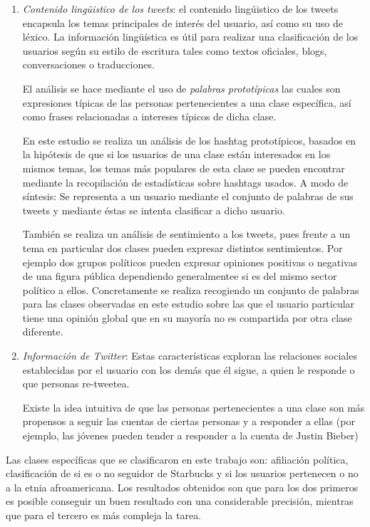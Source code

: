 \begin{enumerate}
        \item \emph{Contenido lingüistico de los tweets}: el contenido lingúistico de los tweets encapsula los temas
        principales de interés del usuario, así como su uso de léxico. La información lingüística es útil para realizar
        una clasificación de los usuarios según su estilo de escritura tales como textos oficiales, blogs,
        conversaciones o traducciones.
       
        El análisis se hace mediante el uso de \emph{palabras prototípicas} las cuales son expresiones típicas de las
        personas pertenecientes a una clase específica, así como frases relacionadas a intereses típicos de dicha clase.
       
        En este estudio se realiza un análisis de los hashtag prototípicos, basados en la hipótesis de que si los usuarios
        de una clase están interesados en los mismos temas, los temas más populares de esta clase se pueden encontrar
        mediante la recopilación de estadísticas sobre hashtags usados. A modo de síntesis: Se representa a un usuario 
        mediante el conjunto de palabras de sus tweets y mediante éstas se intenta clasificar a dicho usuario.

        También se realiza un análisis de sentimiento a los tweets, pues frente a un tema en particular dos clases pueden
        expresar distintos sentimientos. Por ejemplo dos grupos políticos pueden expresar opiniones positivas o negativas
        de una figura pública dependiendo generalmentee si es del mismo sector político a ellos. Concretamente se realiza
        recogiendo un conjunto de palabras para las clases observadas en este estudio sobre las que el usuario particular
        tiene una opinión global que en su mayoría no es compartida por otra clase diferente.
       

        \item \emph{Información de Twitter}: Estas características exploran las relaciones sociales establecidas por
        el usuario con los demás que él sigue, a quien le responde o que personas re-tweetea.
       
        Existe la idea intuitiva de que las personas pertenecientes a una clase son más propensos a seguir las cuentas de ciertas personas y a responder a ellas (por ejemplo, las jóvenes pueden tender a responder a la cuenta de Justin Bieber)
       
    \end{enumerate}

    Las clases específicas que se clasificaron en este trabajo son: afiliación política, clasificación de si es o no seguidor de
    Starbucks y si los usuarios pertenecen o no a la etnia afroamericana. Los resultados obtenidos son que para los dos
    primeros es posible conseguir un buen resultado con una considerable precisión, mientras que para el tercero es más
    compleja la tarea.

